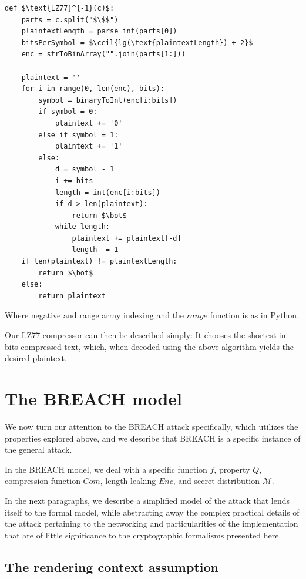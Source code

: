 \documentclass[conference, letterpaper, 10pt]{IEEEtran}
\DeclarePairedDelimiter{\ceil}{\lceil}{\rceil}
\begin{document}
\begin{lstlisting}[texcl,mathescape]
def $\text{LZ77}^{-1}(c)$:
    parts = c.split("$\$$")
    plaintextLength = parse_int(parts[0])
    bitsPerSymbol = $\ceil{lg(\text{plaintextLength}) + 2}$
    enc = strToBinArray("".join(parts[1:]))

    plaintext = ''
    for i in range(0, len(enc), bits):
        symbol = binaryToInt(enc[i:bits])
        if symbol = 0:
            plaintext += '0'
        else if symbol = 1:
            plaintext += '1'
        else:
            d = symbol - 1
            i += bits
            length = int(enc[i:bits])
            if d > len(plaintext):
                return $\bot$
            while length:
                plaintext += plaintext[-d]
                length -= 1
    if len(plaintext) != plaintextLength:
        return $\bot$
    else:
        return plaintext
\end{lstlisting}

Where negative and range array indexing and the $range$ function is as in
Python.

Our LZ77 compressor can then be described simply: It chooses the shortest in
bits compressed text, which, when decoded using the above algorithm yields the
desired plaintext.


\section{The BREACH model}\label{sec:breachmodel}
We now turn our attention to the BREACH attack specifically, which utilizes
the properties explored above, and we describe that BREACH is a specific
instance of the general attack.

In the BREACH model, we deal with a specific function $f$, property $Q$,
compression function $Com$, length-leaking $Enc$, and secret distribution
$\mathcal{M}$.

In the next paragraphs, we describe a simplified model of the attack that
lends itself to the formal model, while abstracting away the complex
practical details of the attack pertaining to the networking and particularities
of the implementation that are of little significance to the cryptographic
formalisms presented here.

\subsection{The rendering context assumption}\label{subsec:rendering}
\end{document}
